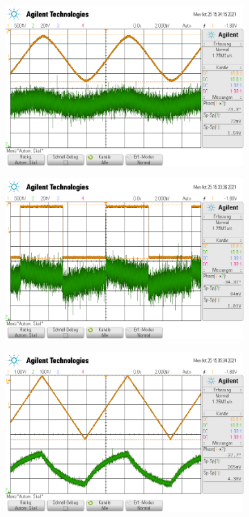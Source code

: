 \begin{figure}
  \centering
  \begin{subfigure}{0.35\textwidth}
    \centering
    \includegraphics[width=\textwidth]{ressources/differential_sinus.png}
  \end{subfigure}
  \begin{subfigure}{0.35\textwidth}
    \centering
    \includegraphics[width=\textwidth]{ressources/differential_rechteck.png}
  \end{subfigure}
  \begin{subfigure}{0.35\textwidth}
    \centering
    \includegraphics[width=\textwidth]{ressources/differential_dreieck.png}

\end{subfigure}
\end{figure}
